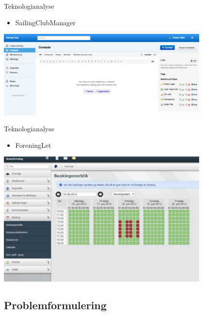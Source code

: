 \begin{frame}{Teknologianalyse}
  \begin{itemize}
    \item SailingClubManager
  \end{itemize}
\includegraphics[width=0.8\textwidth]{images/SCM.jpg}
\end{frame}

\begin{frame}{Teknologianalyse}
  \begin{itemize}
    \item ForeningLet
  \end{itemize}
        \includegraphics[width=0.8\textwidth]{images/ForeningLet.jpg}
\end{frame}


\subsection{Problemformulering}

\begin{frame}{Opsummering)
   \item Fritidsklubber
   \item Sundet
   \item ForeningLet
\end{frame}

